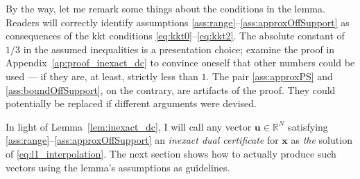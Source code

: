 By the way, let me remark some things about the conditions in the lemma. Readers will correctly identify assumptions \ref{ass:range}--\ref{ass:approxOffSupport} as consequences of the \acrshort{kkt} conditions \ref{eq:kkt0}--\ref{eq:kkt2}. The absolute constant of $1/3$ in the assumed inequalities is a presentation choice; examine the proof in Appendix~\ref{ap:proof_inexact_dc} to convince oneself that other numbers could be used --- if they are, at least, strictly less than $1$. The pair \ref{ass:approxPS} and \ref{ass:boundOffSupport}, on the contrary, are artifacts of the proof. They could potentially be replaced if different arguments were devised.

In light of Lemma~\ref{lem:inexact_dc}, I will call any vector $\mathbf{u} \in \mathbb{R}^{N}$ satisfying \ref{ass:range}--\ref{ass:approxOffSupport} an \emph{inexact dual certificate} for $\mathbf{x}$ as \emph{the} solution of \ref{eq:l1_interpolation}. The next section shows how to actually produce such vectors using the lemma's assumptions as guidelines.